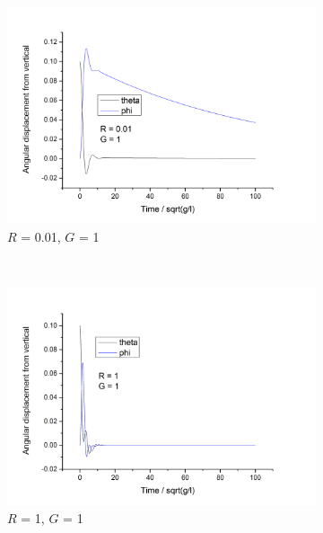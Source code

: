 \documentclass[11pt]{article}
\begin{document}
\begin{figure}[h!] \label{fig:dp_motion_G1}
  \centering
  \begin{subfigure}[h]{0.5\textwidth}
    \includegraphics[width=\textwidth]{img/dp/R=0-01_G=1.png}
    \captionsetup{width=0.85\textwidth}
    \caption{$R$ = 0.01, $G$ = 1}
    \label{fig:dp_R0.01_G1}
  \end{subfigure}%
  ~ %
  \begin{subfigure}[h]{0.5\textwidth}
    \includegraphics[width=\textwidth]{img/dp/R=1_G=1.png}
    \captionsetup{width=0.85\textwidth}
    \caption{$R$ = 1, $G$ = 1}
    \label{fig:dp_R1_G1}
  \end{subfigure}
  ~ %
  \begin{subfigure}[h]{0.5\textwidth}

\end{subfigure}
\end{figure}
\end{document}
